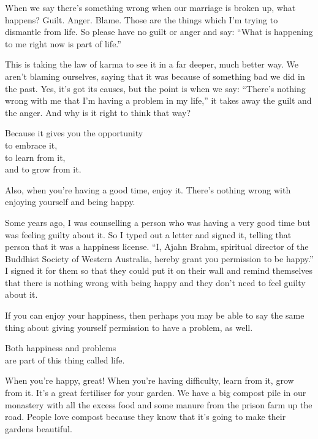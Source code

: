 \documentclass[12pt, openany]{book}
\newenvironment{aphorism}%
{%
\begin{center}\begin{itshape}
}%
{\end{itshape}\end{center}
}%
\begin{document}
When we say there’s something wrong when our marriage is broken up, what happens? Guilt. Anger. Blame. Those are the things which I’m trying to dismantle from life. So please have no guilt or anger and say: “What is happening to me right now is part of life.” 

This is taking the law of karma to see it in a far deeper, much better way. We aren’t blaming ourselves, saying that it was because of something bad we did in the past. Yes, it’s got its causes, but the point is when we say: “There’s nothing wrong with me that I’m having a problem in my life,” it takes away the guilt and the anger. And why is it right to think that way? 

\begin{aphorism}
Because it gives you the opportunity\\  
to embrace it,\\ 
to learn from it,\\  
and to grow from it.
\end{aphorism}

Also, when you’re having a good time, enjoy it. There’s nothing wrong with enjoying yourself and being happy. 

Some years ago, I was counselling a person who was having a very good time but was feeling guilty about it. So I typed out a letter and signed it, telling that person that it was a happiness license. “I, Ajahn Brahm, spiritual director of the Buddhist Society of Western Australia, hereby grant you permission to be happy.” I signed it for them so that they could put it on their wall and remind themselves that there is nothing wrong with being happy and they don’t need to feel guilty about it. 

If you can enjoy your happiness, then perhaps you may be able to say the same thing about giving yourself permission to have a problem, as well. 

\begin{aphorism}
Both happiness and problems\\  
are part of this thing called life.
\end{aphorism}

When you’re happy, great! When you’re having difficulty, learn from it, grow from it. It’s a great fertiliser for your garden. We have a big compost pile in our monastery with all the excess food and some manure from the prison farm up the road. People love compost because they know that it’s going to make their gardens beautiful. 
\end{document}
